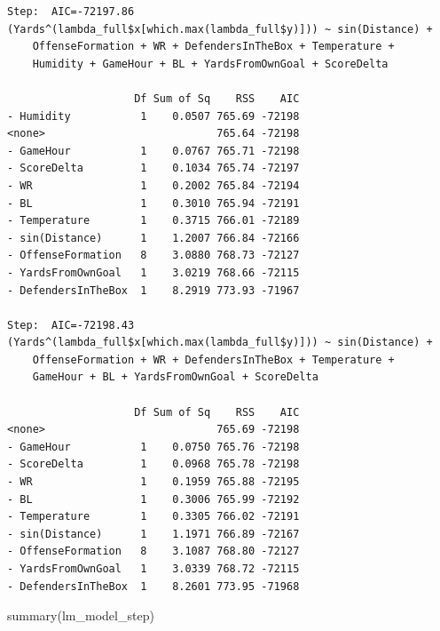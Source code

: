 \documentclass[
  super,
  preprint,
  3p]{elsarticle}
\newenvironment{Shaded}{\begin{snugshade}}{\end{snugshade}}
\newcommand{\FunctionTok}[1]{\textcolor[rgb]{0.28,0.35,0.67}{#1}}
\newcommand{\NormalTok}[1]{\textcolor[rgb]{0.00,0.23,0.31}{#1}}
\begin{document}
\begin{verbatim}
Step:  AIC=-72197.86
(Yards^(lambda_full$x[which.max(lambda_full$y)])) ~ sin(Distance) + 
    OffenseFormation + WR + DefendersInTheBox + Temperature + 
    Humidity + GameHour + BL + YardsFromOwnGoal + ScoreDelta

                    Df Sum of Sq    RSS    AIC
- Humidity           1    0.0507 765.69 -72198
<none>                           765.64 -72198
- GameHour           1    0.0767 765.71 -72198
- ScoreDelta         1    0.1034 765.74 -72197
- WR                 1    0.2002 765.84 -72194
- BL                 1    0.3010 765.94 -72191
- Temperature        1    0.3715 766.01 -72189
- sin(Distance)      1    1.2007 766.84 -72166
- OffenseFormation   8    3.0880 768.73 -72127
- YardsFromOwnGoal   1    3.0219 768.66 -72115
- DefendersInTheBox  1    8.2919 773.93 -71967

Step:  AIC=-72198.43
(Yards^(lambda_full$x[which.max(lambda_full$y)])) ~ sin(Distance) + 
    OffenseFormation + WR + DefendersInTheBox + Temperature + 
    GameHour + BL + YardsFromOwnGoal + ScoreDelta

                    Df Sum of Sq    RSS    AIC
<none>                           765.69 -72198
- GameHour           1    0.0750 765.76 -72198
- ScoreDelta         1    0.0968 765.78 -72198
- WR                 1    0.1959 765.88 -72195
- BL                 1    0.3006 765.99 -72192
- Temperature        1    0.3305 766.02 -72191
- sin(Distance)      1    1.1971 766.89 -72167
- OffenseFormation   8    3.1087 768.80 -72127
- YardsFromOwnGoal   1    3.0339 768.72 -72115
- DefendersInTheBox  1    8.2601 773.95 -71968
\end{verbatim}

\begin{Shaded}
\begin{Highlighting}[]
\FunctionTok{summary}\NormalTok{(lm\_model\_step)}
\end{Highlighting}
\end{Shaded}
\end{document}
